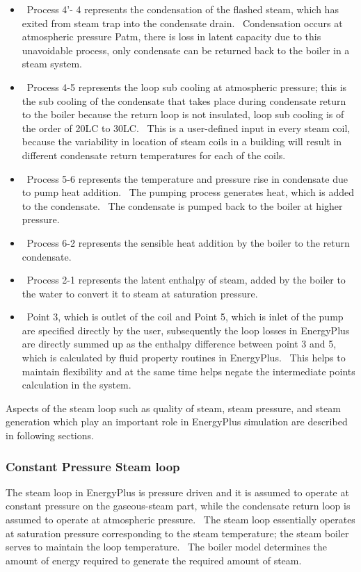 \begin{itemize}
\item
  ~Process 4'- 4 represents the condensation of the flashed steam, which has exited from steam trap into the condensate drain.~ Condensation occurs at atmospheric pressure Patm, there is loss in latent capacity due to this unavoidable process, only condensate can be returned back to the boiler in a steam system.
\item
  ~Process 4-5 represents the loop sub cooling at atmospheric pressure; this is the sub cooling of the condensate that takes place during condensate return to the boiler because the return loop is not insulated, loop sub cooling is of the order of 20LC to 30LC.~ This is a user-defined input in every steam coil, because the variability in location of steam coils in a building will result in different condensate return temperatures for each of the coils.
\item
  ~Process 5-6 represents the temperature and pressure rise in condensate due to pump heat addition.~ The pumping process generates heat, which is added to the condensate.~ The condensate is pumped back to the boiler at higher pressure.
\item
  ~Process 6-2 represents the sensible heat addition by the boiler to the return condensate.
\item
  ~Process 2-1 represents the latent enthalpy of steam, added by the boiler to the water to convert it to steam at saturation pressure.
\item
  ~Point 3, which is outlet of the coil and Point 5, which is inlet of the pump are specified directly by the user, subsequently the loop losses in EnergyPlus are directly summed up as the enthalpy difference between point 3 and 5, which is calculated by fluid property routines in EnergyPlus.~ This helps to maintain flexibility and at the same time helps negate the intermediate points calculation in the system.
\end{itemize}

Aspects of the steam loop such as quality of steam, steam pressure, and steam generation which play an important role in EnergyPlus simulation are described in following sections.

\subsubsection{Constant Pressure Steam loop}\label{constant-pressure-steam-loop}

The steam loop in EnergyPlus is pressure driven and it is assumed to operate at constant pressure on the gaseous-steam part, while the condensate return loop is assumed to operate at atmospheric pressure.~ The steam loop essentially operates at saturation pressure corresponding to the steam temperature; the steam boiler serves to maintain the loop temperature.~ The boiler model determines the amount of energy required to generate the required amount of steam.


